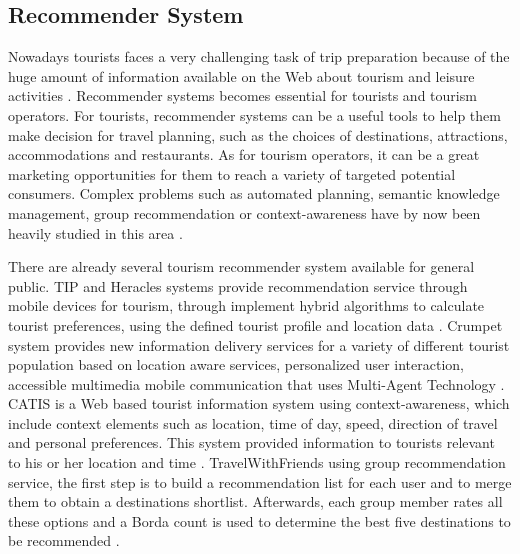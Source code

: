 \subsection{Recommender System}
Nowadays tourists faces a very challenging task of trip preparation because of the
huge amount of information available on the Web about tourism and leisure activities \cite{Adomavicius2015}.
Recommender systems becomes essential for tourists and tourism operators. For tourists,
recommender systems can be a useful tools to help them make decision for travel
planning, such as the choices of destinations, attractions, accommodations and
restaurants. As for tourism operators, it can be a great marketing opportunities for
them to reach a variety of targeted potential consumers. Complex problems such as
automated planning, semantic knowledge management, group recommendation or
context-awareness have by now been heavily studied in this area \cite{morenorecommender}. 

There are already several tourism recommender system available for general public. TIP
and Heracles systems provide recommendation service through mobile devices for tourism,
through implement hybrid algorithms to calculate tourist preferences, using the defined
tourist profile and location data \cite{morenorecommender}. Crumpet system provides new information 
delivery services for a variety of different tourist population based on location aware 
services, personalized user interaction, accessible multimedia mobile communication that
uses Multi-Agent Technology \cite{Santos2018}. CATIS is a Web based tourist information 
system using context-awareness, which include context elements such as location, 
time of day, speed, direction of travel and personal preferences. This system 
provided information to tourists relevant to his or her location and time \cite{Santos2018}. 
TravelWithFriends using group recommendation service, the first step is to build a 
recommendation list for each user and to merge them to obtain a destinations shortlist.
Afterwards, each group member rates all these options and a Borda count is used to 
determine the best five destinations to be recommended \cite{morenorecommender}.

